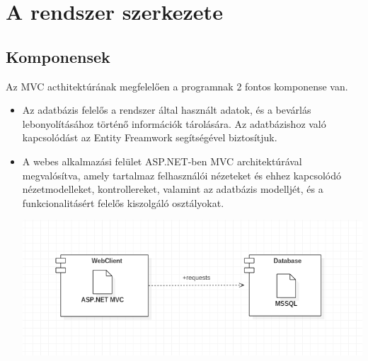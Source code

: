 \documentclass[12pt,a4paper]{article}
\begin{document}
\section{A rendszer szerkezete}
\subsection{Komponensek}
Az MVC acthitektúrának megfelelően a programnak 2 fontos komponense van.
\begin{itemize}
\item Az adatbázis felelős a rendszer által használt adatok, és a bevárlás lebonyolításához történő információk tárolására. Az adatbázishoz való kapcsolódást az  Entity Freamwork segítségével biztosítjuk.
\item A webes alkalmazási felület ASP.NET-ben MVC architektúrával megvalósítva, amely tartalmaz felhasználói nézeteket és ehhez kapcsolódó nézetmodelleket, kontrollereket, valamint az adatbázis modelljét, és a funkcionalitásért felelős kiszolgáló osztályokat.

\includegraphics[scale=0.5]{component}

\end{itemize}
\end{document}
